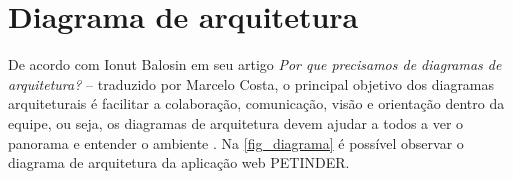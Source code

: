 \chapter{Diagrama de arquitetura}
De acordo com Ionut Balosin em seu artigo \textit{Por que precisamos de diagramas de arquitetura?} – traduzido por Marcelo Costa, o principal objetivo dos diagramas arquiteturais é facilitar a colaboração, comunicação, visão e orientação dentro da equipe, ou seja, os diagramas de arquitetura devem ajudar a todos a ver o panorama e entender o ambiente \cite{diagrama}. Na \autoref{fig_diagrama} é possível observar o diagrama de arquitetura da aplicação web PETINDER.


